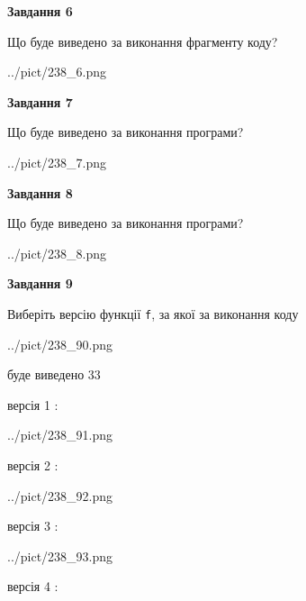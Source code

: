 \documentclass[12pt, ukrainian]{article}
\def\code#1{\Verb!#1!}
\begin{document}
{\begin {large}
{\begin {center}\textbf{Завдання 6}\end {center}}

Що буде виведено за виконання фрагменту коду?\par
\begin{center}
	{../pict/238_6.png}
\end{center}
\newpage

{\begin {center}\textbf{Завдання 7}\end {center}}

Що буде виведено за виконання програми?\par
\begin{center}
	{../pict/238_7.png}
\end{center}
\newpage

{\begin {center}\textbf{Завдання 8}\end {center}}

Що буде виведено за виконання програми?\par
\begin{center}
	{../pict/238_8.png}
\end{center}
\newpage

{\begin {center}\textbf{Завдання 9}\end {center}}

Виберіть версію функції \code{f}, за якої за виконання коду
\begin{center}
	{../pict/238_90.png}
\end{center}
буде виведено 33

\vspace{5mm}
версія 1 :

\begin{center}
	{../pict/238_91.png}
\end{center}
версія 2 :

\begin{center}
	{../pict/238_92.png}
\end{center}
версія 3 :

\begin{center}
	{../pict/238_93.png}
\end{center}
версія 4 :


\end{large}}
\end{document}
